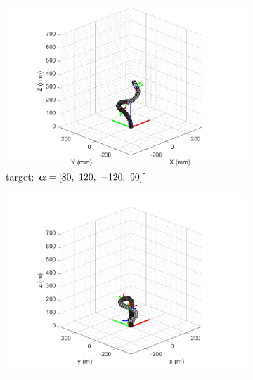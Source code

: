 \begin{figure}[H] %
    \centering %
    \captionsetup{labelsep=colon}
    \begin{subfigure}{0.9\textwidth} %
        \centering
        \includegraphics[width=\linewidth]{Image/MATLAB/manipulator_80_120_-120_90.png}
        \caption{\centering target: $\boldsymbol{\alpha} = [80,\ 120,\ -120,\ 90] \degree$ \\ \qquad}
        \label{fig:complex_target}
    \end{subfigure}
    \begin{subfigure}{0.49\textwidth} %
        \centering
        \includegraphics[width=\linewidth]{Image/MATLAB/manipulator_-8.88_-89.99_-126.81_-169.73.png}

\end{subfigure}
\end{figure}
